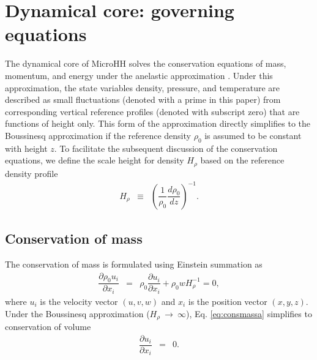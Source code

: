 \documentclass[gmd,manuscript]{copernicus}
\begin{document}
\section{Dynamical core: governing equations}\label{sec:dyncore}
The dynamical core of MicroHH solves the conservation equations of mass, momentum, and energy under the anelastic approximation \citep{Bannon1996}. Under this approximation, the state variables density, pressure, and temperature are described as small fluctuations (denoted with a prime in this paper) from corresponding vertical reference profiles (denoted with subscript zero) that are functions of height only. This form of the approximation directly simplifies to the Boussinesq approximation if the reference density $\rho_0$ is assumed to be constant with height $z$. To facilitate the subsequent discussion of the conservation equations, we define the scale height for density $H_\rho$ based on the reference density profile
\begin{eqnarray}
H_{\rho} & \equiv & \left( \dfrac{1}{\rho_0} \dfrac{d \rho_0}{dz} \right)^{-1}.
\end{eqnarray}

\subsection{Conservation of mass}
The conservation of mass is formulated using Einstein summation as
\begin{eqnarray}
\dfrac{\partial \rho_0 u_i}{\partial x_i} & = & \rho_0 \dfrac{\partial u_i}{\partial x_i} + \rho_0 w H_{\rho}^{-1} = 0, \label{eq:consmassa}
\end{eqnarray}
where $u_i$ is the velocity vector $(u,v,w)$ and $x_i$ is the position vector $(x,y,z)$.
Under the Boussinesq approximation ($H_{\rho}~\rightarrow~\infty$), Eq. \ref{eq:consmassa} simplifies to conservation of volume
\begin{eqnarray}
\dfrac{\partial u_i}{\partial x_i} & = & 0. \label{eq:consmassb}
\end{eqnarray}
\end{document}
